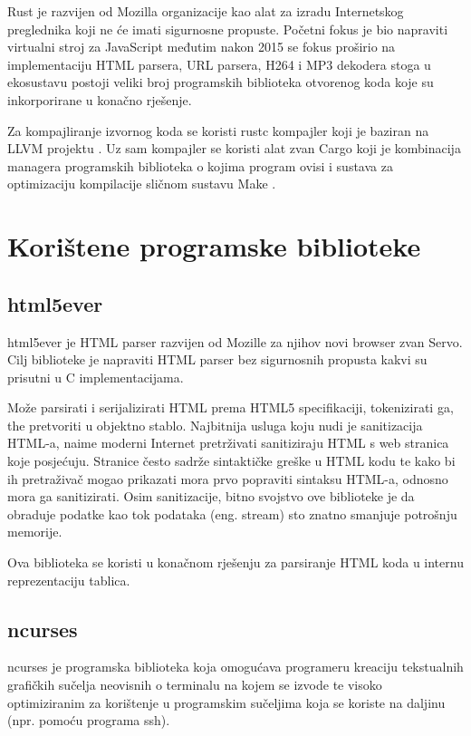 \documentclass[times, utf8, zavrsni]{fer}
\begin{document}
Rust je razvijen od Mozilla organizacije kao alat za izradu Internetskog
preglednika koji ne će imati sigurnosne propuste. Početni fokus je bio
napraviti virtualni stroj za JavaScript međutim nakon 2015 se fokus proširio na
implementaciju HTML parsera, URL parsera, H264 i MP3 dekodera stoga u ekosustavu
postoji veliki broj programskih biblioteka otvorenog koda koje su inkorporirane
u konačno rješenje.

Za kompajliranje izvornog koda se koristi rustc kompajler koji je baziran na
LLVM projektu \cite{llvm_page}. Uz sam kompajler se koristi alat zvan
Cargo \cite{cargo_documentation}
koji je kombinacija managera programskih biblioteka o kojima program ovisi i
sustava za optimizaciju kompilacije sličnom sustavu
Make \cite{make_documentation}.

\section{Korištene programske biblioteke}

\subsection{html5ever}

html5ever \cite{html5ever_repository} je HTML parser razvijen od Mozille za
njihov novi browser zvan Servo.
Cilj biblioteke je napraviti HTML parser bez sigurnosnih propusta kakvi su
prisutni u C implementacijama.

Može parsirati i serijalizirati HTML prema HTML5 specifikaciji, tokenizirati ga,
the pretvoriti u objektno stablo. Najbitnija usluga koju nudi je sanitizacija
HTML-a, naime moderni Internet pretrživati sanitiziraju HTML s web stranica
koje posjećuju. Stranice često sadrže sintaktičke greške u HTML kodu te kako
bi ih pretraživač mogao prikazati mora prvo popraviti sintaksu HTML-a,
odnosno mora ga sanitizirati. Osim sanitizacije, bitno svojstvo ove
biblioteke je da obraduje podatke kao tok podataka (eng. stream) sto znatno
smanjuje potrošnju memorije.

Ova biblioteka se koristi u konačnom rješenju za parsiranje HTML koda u
internu reprezentaciju tablica.

\subsection{ncurses}

ncurses \cite{ncurses_documentation} je programska biblioteka koja omogućava
programeru kreaciju
tekstualnih grafičkih sučelja neovisnih o terminalu na kojem se izvode te
visoko optimiziranim za korištenje u programskim sučeljima koja se koriste na
daljinu (npr. pomoću programa ssh).
\end{document}
